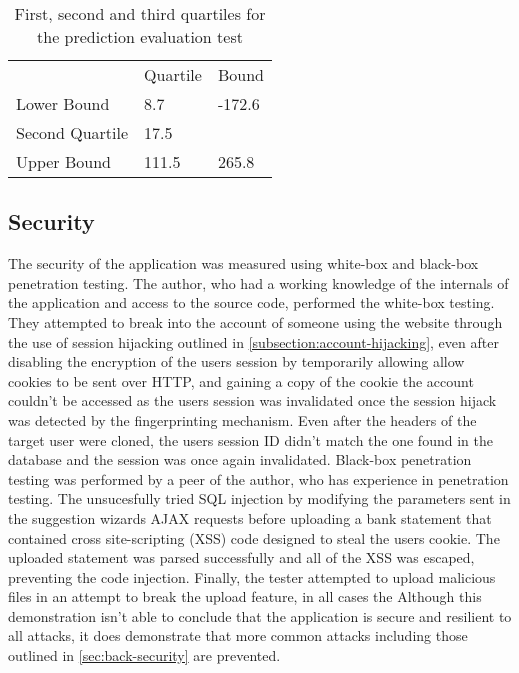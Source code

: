 \begin{table}[h]
\centering
\begin{tabular}{lll}
                & Quartile & Bound  \\
Lower Bound     & 8.7      & -172.6 \\
Second Quartile & 17.5     &        \\
Upper Bound     & 111.5    & 265.8 
\end{tabular}
\caption{First, second and third quartiles for the prediction evaluation test}
\label{tab:quartiles}
\end{table}

\subsection{Security}
The security of the application was measured using white-box and black-box penetration testing.
%
The author, who had a working knowledge of the internals of the application and access to the source code, performed the white-box testing. They attempted to break into the account of someone using the website through the use of session hijacking outlined in \autoref{subsection:account-hijacking}, even after disabling the encryption of the users session by temporarily allowing allow cookies to be sent over HTTP, and gaining a copy of the cookie the account couldn't be accessed as the users session was invalidated once the session hijack was detected by the fingerprinting mechanism. Even after the headers of the target user were cloned, the users session ID didn't match the one found in the database and the session was once again invalidated.
%
Black-box penetration testing was performed by a peer of the author, who has experience in penetration testing. The unsucesfully tried SQL injection by modifying the parameters sent in the suggestion wizards AJAX requests before uploading a bank statement that contained cross site-scripting (XSS) code designed to steal the users cookie. The uploaded statement was parsed successfully and all of the XSS was escaped, preventing the code injection. Finally, the tester attempted to upload malicious files in an attempt to break the upload feature, in all cases the 
%
Although this demonstration isn't able to conclude that the application is secure and resilient to all attacks, it does demonstrate that more common attacks including those outlined in \autoref{sec:back-security} are prevented.
